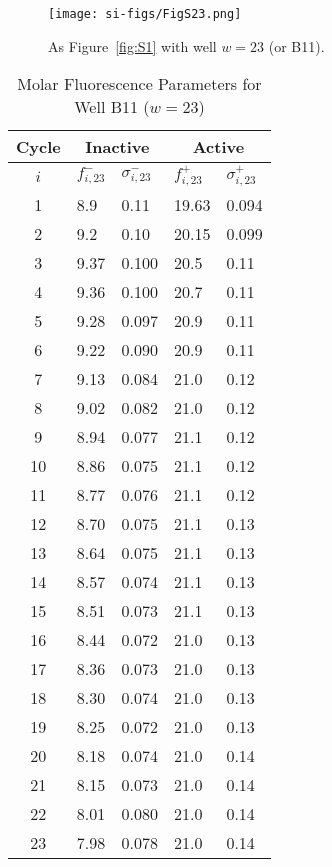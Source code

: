                 \begin{figure}
                    \centering
                    \texttt{[image: si-figs/FigS23.png]}
                    \caption{
                        As Figure~\ref{fig:S1} with well $w=23$ (or B11).
                    }
                \end{figure}
                \clearpage
    \begin{table}
        \caption{Molar Fluorescence Parameters for Well B11 ($w=23$)}
        \centering
        \begin{tabular}{c|ll|ll}
            Cycle & \multicolumn{2}{c|}{Inactive} & \multicolumn{2}{c}{Active} \\
            \hline
            $i$ & $f_{i,23}^{-}$ & $\sigma_{i,23}^{-}$ &  $f_{i,23}^{+}$ & $\sigma_{i,23}^{+}$ \\
            \hline
    1 & 8.9 & 0.11 & 19.63 & 0.094 \\
2 & 9.2 & 0.10 & 20.15 & 0.099 \\
3 & 9.37 & 0.100 & 20.5 & 0.11 \\
4 & 9.36 & 0.100 & 20.7 & 0.11 \\
5 & 9.28 & 0.097 & 20.9 & 0.11 \\
6 & 9.22 & 0.090 & 20.9 & 0.11 \\
7 & 9.13 & 0.084 & 21.0 & 0.12 \\
8 & 9.02 & 0.082 & 21.0 & 0.12 \\
9 & 8.94 & 0.077 & 21.1 & 0.12 \\
10 & 8.86 & 0.075 & 21.1 & 0.12 \\
11 & 8.77 & 0.076 & 21.1 & 0.12 \\
12 & 8.70 & 0.075 & 21.1 & 0.13 \\
13 & 8.64 & 0.075 & 21.1 & 0.13 \\
14 & 8.57 & 0.074 & 21.1 & 0.13 \\
15 & 8.51 & 0.073 & 21.1 & 0.13 \\
16 & 8.44 & 0.072 & 21.0 & 0.13 \\
17 & 8.36 & 0.073 & 21.0 & 0.13 \\
18 & 8.30 & 0.074 & 21.0 & 0.13 \\
19 & 8.25 & 0.072 & 21.0 & 0.13 \\
20 & 8.18 & 0.074 & 21.0 & 0.14 \\
21 & 8.15 & 0.073 & 21.0 & 0.14 \\
22 & 8.01 & 0.080 & 21.0 & 0.14 \\
23 & 7.98 & 0.078 & 21.0 & 0.14 \\

\end{tabular}
\end{table}
